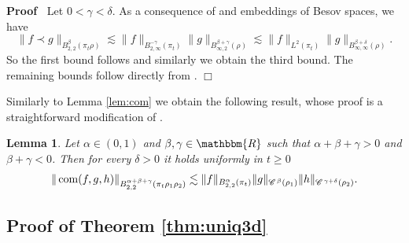 \documentclass[a4paper,11pt]{article}
\newcommand{\tmop}[1]{\ensuremath{\operatorname{#1}}}
\newenvironment{proof}{\noindent\textbf{Proof\ }}{\hspace*{\fill}$\Box$\medskip}
\newtheorem{lemma}[theorem]{Lemma}
\numberwithin{equation}{section}
\newcommand{\CC}{\mathscr{C} \hspace{.1em}}
\newcommand{\8}{\infty}
\begin{document}
\begin{proof}
Let  $0<\gamma<\delta$. As a consequence of  \cite[Theorem 3.17]{MW17} and embeddings of Besov spaces, we have
  \[ \| f \prec g \|_{B_{2, 2}^{\beta} (\pi_{t} \rho)} \lesssim \| f \|_{B^{-
     \gamma}_{2, \infty} (\pi_{t})} \| g \|_{B^{\beta+\gamma}_{\infty, 2} (\rho)}
     \lesssim \| f \|_{L^2 (\pi_{t})} \| g \|_{B^{\beta + \delta}_{\infty, \infty}
     (\rho)} . \]
     So the first bound follows and similarly we obtain the third bound.
     The remaining bounds follow directly from  \cite[Theorem 3.17]{MW17}.
\end{proof}

Similarly to Lemma \ref{lem:com} we obtain the following result, whose  proof is a straightforward modification of \cite[Lemma 2.4]{GIP}.
\begin{lemma}
  \label{lem:com1}
  Let $\alpha \in (0, 1)$ and $\beta,
  \gamma \in \mathbbm{R}$ such that $\alpha + \beta + \gamma > 0$ and $\beta +
  \gamma < 0$. Then for every $\delta > 0$ it holds uniformly in $t\ge 0$
  \[ \| \tmop{com} (f, g, h) \|_{B^{\alpha + \beta + \gamma}_{2, 2} (\pi_{t}
     \rho_{1}\rho_{2})} \lesssim \| f \|_{B^{\alpha}_{2, 2} (\pi_{t})} \| g \|_{\CC^{\beta}
     (\rho_{1})} \| h \|_{\CC^{\gamma + \delta} (\rho_{2})} . \]
\end{lemma}


\subsection{Proof of Theorem \ref{thm:uniq3d}}
\end{document}
